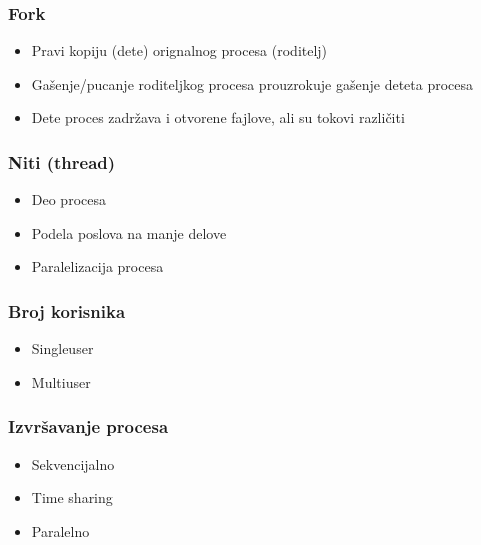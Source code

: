 \documentclass{beamer}
\begin{document}
\begin{frame}
    \frametitle{Fork}
    \begin{itemize}
        \item Pravi kopiju (dete) orignalnog procesa (roditelj) \newline
        \item Gašenje/pucanje roditeljkog procesa prouzrokuje gašenje deteta procesa \newline
        \item Dete proces zadržava i otvorene fajlove, ali su tokovi različiti
    \end{itemize}
\end{frame}

\begin{frame}
    \frametitle{Niti (thread)}
    \begin{itemize}
        \item Deo procesa \newline
        \item Podela poslova na manje delove \newline
        \item Paralelizacija procesa 
    \end{itemize}
\end{frame}

\begin{frame}
    \frametitle{Broj korisnika}
    \begin{itemize}
        \item Singleuser \newline
        \item Multiuser
    \end{itemize}
\end{frame}

\begin{frame}
    \frametitle{Izvršavanje procesa}
    \begin{itemize}
        \item Sekvencijalno \newline
        \item Time sharing \newline
        \item Paralelno
    \end{itemize}
\end{frame}
\end{document}
